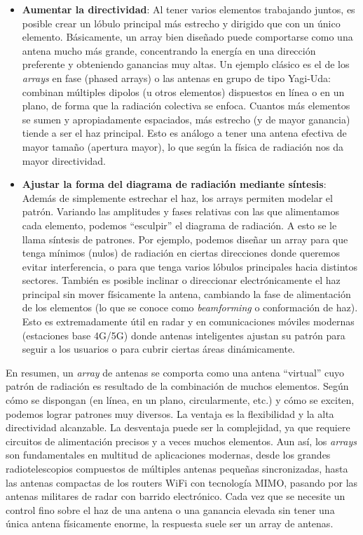 \begin{itemize}
    \item \textbf{Aumentar la directividad}: Al tener varios elementos trabajando juntos, es posible crear un lóbulo principal más estrecho y dirigido que con un único elemento. Básicamente, un array bien diseñado puede comportarse como una antena mucho más grande, concentrando la energía en una dirección preferente y obteniendo ganancias muy altas. Un ejemplo clásico es el de los \textit{arrays} en fase (phased arrays) o las antenas en grupo de tipo Yagi-Uda: combinan múltiples dipolos (u otros elementos) dispuestos en línea o en un plano, de forma que la radiación colectiva se enfoca. Cuantos más elementos se sumen y apropiadamente espaciados, más estrecho (y de mayor ganancia) tiende a ser el haz principal. Esto es análogo a tener una antena efectiva de mayor tamaño (apertura mayor), lo que según la física de radiación nos da mayor directividad.\\
    
    \item \textbf{Ajustar la forma del diagrama de radiación mediante síntesis}: Además de simplemente estrechar el haz, los arrays permiten modelar el patrón. Variando las amplitudes y fases relativas con las que alimentamos cada elemento, podemos “esculpir” el diagrama de radiación. A esto se le llama síntesis de patrones. Por ejemplo, podemos diseñar un array para que tenga mínimos (nulos) de radiación en ciertas direcciones donde queremos evitar interferencia, o para que tenga varios lóbulos principales hacia distintos sectores. También es posible inclinar o direccionar electrónicamente el haz principal sin mover físicamente la antena, cambiando la fase de alimentación de los elementos (lo que se conoce como \textit{beamforming} o conformación de haz). Esto es extremadamente útil en radar y en comunicaciones móviles modernas (estaciones base 4G/5G) donde antenas inteligentes ajustan su patrón para seguir a los usuarios o para cubrir ciertas áreas dinámicamente.\\
\end{itemize}

En resumen, un \textit{array} de antenas se comporta como una antena “virtual” cuyo patrón de radiación es resultado de la combinación de muchos elementos. Según cómo se dispongan (en línea, en un plano, circularmente, etc.) y cómo se exciten, podemos lograr patrones muy diversos. La ventaja es la flexibilidad y la alta directividad alcanzable. La desventaja puede ser la complejidad, ya que requiere circuitos de alimentación precisos y a veces muchos elementos. Aun así, los \textit{arrays} son fundamentales en multitud de aplicaciones modernas, desde los grandes radiotelescopios compuestos de múltiples antenas pequeñas sincronizadas, hasta las antenas compactas de los routers WiFi con tecnología MIMO, pasando por las antenas militares de radar con barrido electrónico. Cada vez que se necesite un control fino sobre el haz de una antena o una ganancia elevada sin tener una única antena físicamente enorme, la respuesta suele ser un array de antenas.

